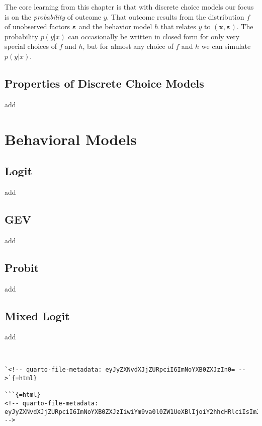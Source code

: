 \documentclass[
  letterpaper,
  DIV=11,
  numbers=noendperiod]{scrreprt}
\begin{document}
The core learning from this chapter is that with discrete choice models
our focus is on the \emph{probability} of outcome \(y\). That outcome
results from the distribution \(f\) of unobserved factors
\(\boldsymbol{\varepsilon}\) and the behavior model \(h\) that relates
\(y\) to \((\mathbf{x}, \boldsymbol{\varepsilon})\). The probability
\(p(y|x)\) can occasionally be written in closed form for only very
special choices of \(f\) and \(h\), but for almost any choice of \(f\)
and \(h\) we can simulate \(p(y|x)\).

\chapter{Properties of Discrete Choice Models}\label{sec-properties}

add

\part{Behavioral Models}

\chapter{Logit}\label{sec-logit}

add

\chapter{GEV}\label{sec-gev}

add

\chapter{Probit}\label{sec-probit}

add

\chapter{Mixed Logit}\label{sec-mixedlogit}

add

\begin{verbatim}


`<!-- quarto-file-metadata: eyJyZXNvdXJjZURpciI6ImNoYXB0ZXJzIn0= -->`{=html}

```{=html}
<!-- quarto-file-metadata: eyJyZXNvdXJjZURpciI6ImNoYXB0ZXJzIiwiYm9va0l0ZW1UeXBlIjoiY2hhcHRlciIsImJvb2tJdGVtTnVtYmVyIjo3LCJib29rSXRlbUZpbGUiOiJjaGFwdGVycy8wN192YXJpYXRpb25zLnFtZCIsImJvb2tJdGVtRGVwdGgiOjF9 -->
\end{verbatim}
\end{document}
